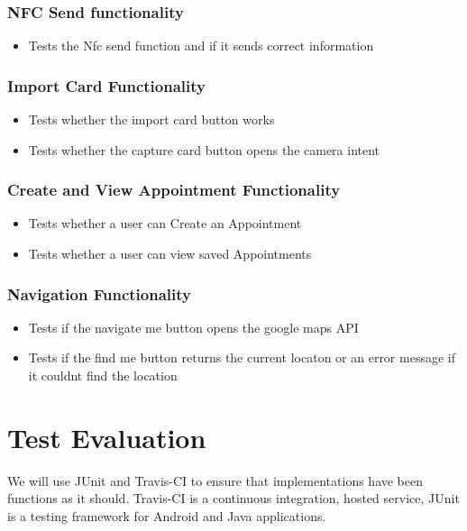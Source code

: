 \documentclass[english]{article}
\begin{document}
		\subsubsection{NFC Send functionality}
		\begin{itemize} 
			\item Tests the Nfc send function and if it sends correct information
		\end{itemize}

		\subsubsection{Import Card Functionality}
		\begin{itemize}
			\item Tests whether the import card button works
			\item Tests whether the capture card button opens the camera intent
		\end{itemize}
		\subsubsection{Create and View Appointment Functionality}
		\begin{itemize}
			\item Tests whether a user can Create an Appointment
			\item Tests whether a user can view saved Appointments
		\end{itemize}
		\subsubsection{Navigation Functionality}
		\begin{itemize}
			\item Tests if the navigate me button opens the google maps API
			\item Tests if the find me button returns the current locaton or an error message if it couldnt find the location
		\end{itemize}
		
			
	
		

	\section{Test Evaluation}
	
	We will use JUnit and  Travis-CI to ensure that implementations have been functions as it should.
	Travis-CI is a continuous integration, hosted service,  JUnit is a testing framework for Android and Java applications.
\end{document}
